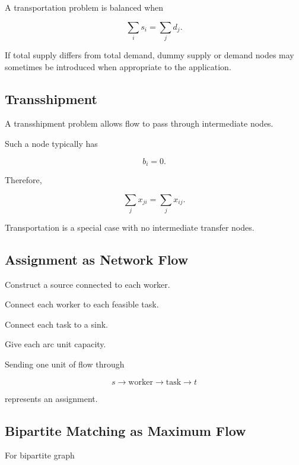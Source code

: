 A transportation problem is balanced when

\[
\boxed{
\sum_i
s_i
=
\sum_j
d_j.
}
\]

If total supply differs from total demand, dummy supply or demand nodes
may sometimes be introduced when appropriate to the application.

\subsection{Transshipment}
\label{subsec:transshipment}

A transshipment problem allows flow to pass through intermediate nodes.

Such a node typically has

\[
\boxed{
b_i=0.
}
\]

Therefore,

\[
\boxed{
\sum_jx_{ji}
=
\sum_jx_{ij}.
}
\]

Transportation is a special case with no intermediate transfer nodes.

\subsection{Assignment as Network Flow}
\label{subsec:assignment-network-flow}

Construct a source connected to each worker.

Connect each worker to each feasible task.

Connect each task to a sink.

Give each arc unit capacity.

Sending one unit of flow through

\[
\boxed{
s
\to
\text{worker}
\to
\text{task}
\to
t
}
\]

represents an assignment.

\subsection{Bipartite Matching as Maximum Flow}
\label{subsec:bipartite-matching-flow}

For bipartite graph

